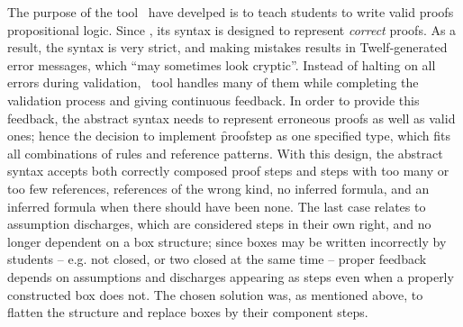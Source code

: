 \documentclass[BA.tex]{subfiles}
\begin{document}
The purpose of the tool \we\ have develped is to teach students to write 
 valid proofs  propositional logic. 
  Since , its syntax is designed to represent \emph{correct}
 proofs. As a result, the syntax is very strict, and making mistakes results
 in Twelf-generated error messages, which ``may sometimes look 
 cryptic''\cite[`Dealing with errors']{boxhelp}. Instead of halting on all
 errors during validation, \our\ tool handles many of them while completing 
 the validation process and giving continuous feedback. In order to 
 provide this feedback, the abstract syntax needs to represent erroneous 
 proofs as well as valid ones; hence the decision to implement 
 \f{proofstep} as one specified type, which fits all combinations of rules
 and reference patterns. With this design, the abstract syntax accepts both
 correctly composed proof steps and steps with too many or too few 
 references, references of the wrong kind, no inferred formula, and an
 inferred formula when there should have been none. The last case relates
 to assumption discharges, which are considered steps in their own right,
 and no longer dependent on a box structure; since boxes may be written
 incorrectly by students -- e.g. not closed, or two closed at the same time
 -- proper feedback depends on assumptions and discharges appearing as
 steps even when a properly constructed box does not. The chosen
 solution was, as mentioned above, to flatten the structure and replace
 boxes by their component steps.
\end{document}
